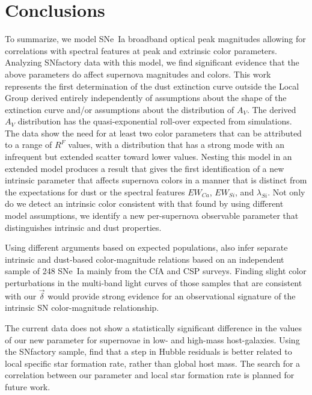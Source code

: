 \documentclass{aastex61}   	%
\begin{document}
\section{Conclusions}
\label{conclusions:sec}
To summarize, we model SNe~Ia broadband optical peak magnitudes allowing for correlations with spectral features at peak and
extrinsic color parameters.  Analyzing SNfactory data with this model, we find significant evidence that the above parameters do
affect supernova magnitudes and colors.  
This work represents the first determination of the dust extinction curve outside the Local Group
derived entirely independently of assumptions about the shape of the extinction curve and/or assumptions about the
distribution of $A_V$.  
The derived $A_V$ distribution has the quasi-exponential roll-over expected from simulations.
The data show the need for at least two color parameters that can be attributed to a range of $R^F$ values, with a distribution that
has a strong mode with an infrequent but extended scatter toward lower values.
Nesting this model in an extended model produces a result that 
gives the first identification of  a new
intrinsic
parameter that affects supernova
colors in a manner that is distinct from the expectations for dust or the spectral features $EW_{Ca}$, $EW_{Si}$, and $\lambda_{Si}$.
Not only do we detect an intrinsic color consistent with that
found by  using different model assumptions,
we identify a new per-supernova observable parameter that distinguishes intrinsic
and dust properties.

Using different arguments based on expected populations,  also infer
separate intrinsic and dust-based color-magnitude relations based on an independent sample of 248 SNe~Ia
mainly from the CfA \citep{1999AJ....117..707R, 2006AJ....131..527J, 2009ApJ...700.1097H, 2012ApJS..200...12H}
and CSP \citep{2010AJ....139..519C, 2011AJ....142..156S} surveys.
Finding slight color perturbations in the multi-band light curves 
of those samples that are  consistent with our $\vec{\delta}$ would provide strong evidence for  an
observational signature of the intrinsic SN color-magnitude relationship.


The current data does not show a statistically significant difference in the values of our new parameter for supernovae
in low- and high-mass host-galaxies.
Using the SNfactory sample,
\citet{2017Rigault} find that a step in Hubble residuals is better related to local 
specific
star 
formation rate, rather than
global host mass.  The search for a correlation between our parameter and local star formation rate is planned for future work.
\end{document}
